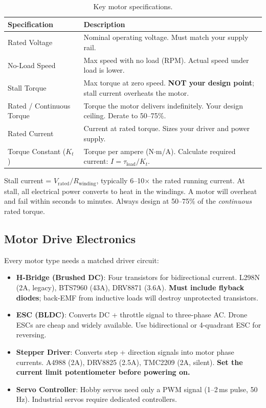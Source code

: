 \documentclass[11pt,letterpaper,twoside,openany]{book}
\begin{document}
\begin{table}[htbp]
\centering\small
\begin{tabularx}{\textwidth}{l X}
  \toprule
  \textbf{Specification} & \textbf{Description} \\
  \midrule
  Rated Voltage & Nominal operating voltage. Must match your supply rail. \\
  No-Load Speed & Max speed with no load (RPM). Actual speed under load is lower. \\
  Stall Torque & Max torque at zero speed. \textbf{NOT your design point}; stall current overheats the motor. \\
  Rated / Continuous Torque & Torque the motor delivers indefinitely. Your design ceiling. Derate to 50--75\%. \\
  Rated Current & Current at rated torque. Sizes your driver and power supply. \\
  Torque Constant ($K_t$) & Torque per ampere (N$\cdot$m/A). Calculate required current: $I = \tau_{\text{load}} / K_t$. \\
  \bottomrule
\end{tabularx}
\caption{Key motor specifications.}
\end{table}

\begin{warningbox}
Stall current = $V_{\text{rated}} / R_{\text{winding}}$, typically 6--10$\times$ the rated running current. At stall, all electrical power converts to heat in the windings. A motor will overheat and fail within seconds to minutes. Always design at 50--75\% of the \emph{continuous} rated torque.
\end{warningbox}

\subsection{Motor Drive Electronics}
\label{sec:motor_drivers}

Every motor type needs a matched driver circuit:

\begin{itemize}[leftmargin=1.5em]
  \item \textbf{H-Bridge (Brushed DC)}: Four transistors for bidirectional current. L298N (2A, legacy), BTS7960 (43A), DRV8871 (3.6A). \textbf{Must include flyback diodes}; back-EMF from inductive loads will destroy unprotected transistors.
  \item \textbf{ESC (BLDC)}: Converts DC + throttle signal to three-phase AC. Drone ESCs are cheap and widely available. Use bidirectional or 4-quadrant ESC for reversing.
  \item \textbf{Stepper Driver}: Converts step + direction signals into motor phase currents. A4988 (2A), DRV8825 (2.5A), TMC2209 (2A, silent). \textbf{Set the current limit potentiometer before powering on.}
  \item \textbf{Servo Controller}: Hobby servos need only a PWM signal (1--2\,ms pulse, 50\,Hz). Industrial servos require dedicated controllers.
\end{itemize}
\end{document}
